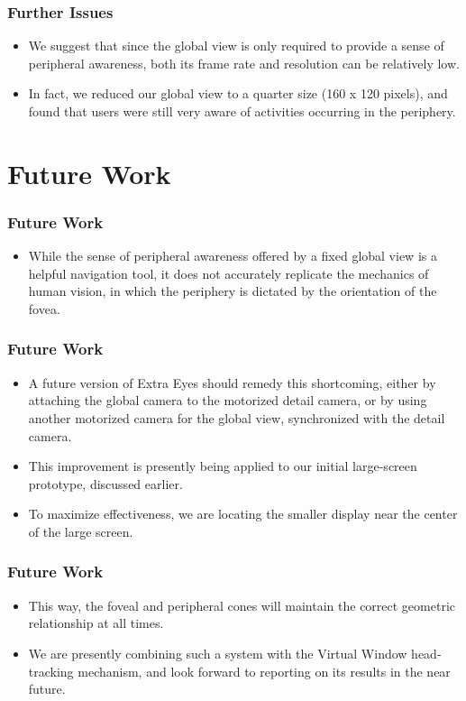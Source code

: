 \documentclass{beamer}
\begin{document}
\begin{frame}
\frametitle{Further Issues}

\begin{itemize}
\item We suggest that since the global view is only required to provide a sense of peripheral awareness, both its frame rate and resolution can be relatively low.
\item In fact, we reduced our global view to a quarter size (160 x 120 pixels), and found that users were still very aware of activities occurring in the periphery.
\end{itemize}

\end{frame}

\section[Future Work]{Future Work}


\begin{frame}
\frametitle{Future Work}

\begin{itemize}
\item While the sense of peripheral awareness offered by a fixed global view is a helpful navigation tool, it does not accurately replicate the mechanics of human vision, in which the periphery is dictated by the orientation of the fovea.
\end{itemize}

\end{frame}

\begin{frame}
\frametitle{Future Work}

\begin{itemize}
\item A future version of Extra Eyes should remedy this shortcoming, either by attaching the global camera to the motorized detail camera, or by using another motorized camera for the global view, synchronized with the detail camera.
\item This improvement is presently being applied to our initial large-screen prototype, discussed earlier.
\item To maximize effectiveness, we are locating the smaller display near the center of the large screen.
\end{itemize}

\end{frame}

\begin{frame}
\frametitle{Future Work}

\begin{itemize}
\item This way, the foveal and peripheral cones will maintain the correct geometric relationship at all times.
\item We are presently combining such a system with the Virtual Window head-tracking mechanism, and look forward to reporting on its results in the near future.
\end{itemize}

\end{frame}
\end{document}
